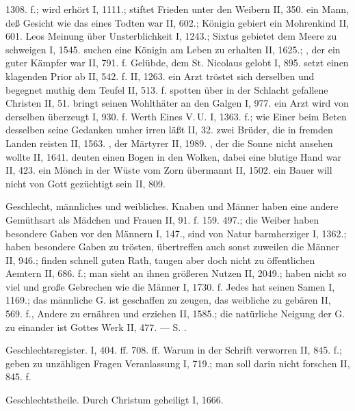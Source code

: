 1308. f.; wird erhört I, 1111.; stiftet Frieden unter den Weibern II, 350.  ein Mann, deß Gesicht wie das eines Todten war II, 602.; Königin gebiert ein Mohrenkind II, 601.  Leos Meinung über Unsterblichkeit I, 1243.; Sixtus gebietet dem Meere zu schweigen I, 1545.  suchen eine Königin am Leben zu erhalten II, 1625.; , der ein guter Kämpfer war II, 791. f.  Gelübde, dem St. Nicolaus gelobt I, 895.  setzt einen klagenden Prior ab II, 542. f.  II, 1263.  ein Arzt tröstet sich derselben und begegnet muthig dem Teufel II, 513. f.  spotten über in der Schlacht gefallene Christen II, 51.  bringt seinen Wohlthäter an den Galgen I, 977.  ein Arzt wird von derselben überzeugt I, 930. f.  Werth Eines V.\,U. I, 1363. f.; wie Einer beim Beten desselben seine Gedanken umher irren läßt II, 32.  zwei Brüder, die in fremden Landen reisten II, 1563. , der Märtyrer II, 1989. , der die Sonne nicht ansehen wollte II, 1641.  deuten einen Bogen in den Wolken, dabei eine blutige Hand war II, 423.  ein Mönch in der Wüste vom Zorn übermannt II, 1502.  ein Bauer will nicht von Gott gezüchtigt sein II, 809.

Geschlecht, männliches und weibliches. Knaben und Männer haben eine andere Gemüthsart als Mädchen und Frauen II, 91. f. 159. 497.; die Weiber haben besondere Gaben vor den Männern I, 147., sind von Natur barmherziger I, 1362.; haben besondere Gaben zu trösten, übertreffen auch sonst zuweilen die Männer II, 946.; finden schnell guten Rath, taugen aber doch nicht zu öffentlichen Aemtern II, 686. f.; man sieht an ihnen größeren Nutzen II, 2049.; haben nicht so viel und große Gebrechen wie die Männer I, 1730. f. Jedes hat seinen Samen I, 1169.; das männliche G. ist geschaffen zu zeugen, das weibliche zu gebären II, 569. f., Andere zu ernähren und erziehen II, 1585.; die natürliche Neigung der G. zu einander ist Gottes Werk II, 477. — S. .

Geschlechtsregister. I, 404. ff. 708. ff. Warum in der Schrift verworren II, 845. f.; geben zu unzähligen Fragen Veranlassung I, 719.; man soll darin nicht forschen II, 845. f.

Geschlechtstheile. Durch Christum geheiligt I, 1666.

